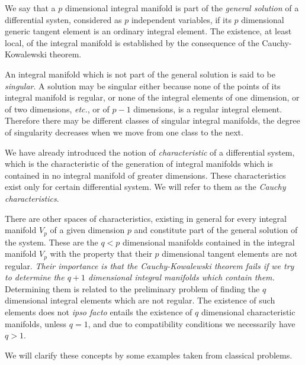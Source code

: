 \fsec We say that a $p$ dimensional integral manifold is part of the \emph{general solution} of a differential systen, considered as $p$ independent variables, if its $p$ dimensional generic tangent element is an ordinary integral element. The existence, at least local, of the integral manifold is established by the consequence of the Cauchy-Kowalewski theorem.

An integral manifold which is not part of the general solution is said to be \emph{singular}. A solution may be singular either because none of the points of its integral manifold is regular, or none of the integral elements of one dimension, or of two dimensions, \emph{etc.}, or of $p-1$ dimensions, is a regular integral element. Therefore there may be different classes of singular integral manifolds, the degree of singularity decreases when we move from one class to the next.



\vspace{12pt}\fsec We have already introduced the notion of \emph{characteristic} of a differential system, which is the characteristic of the generation of integral manifolds which is contained in no integral manifold of greater dimensions. These characteristics exist only for certain differential system. We will refer to them as the \emph{Cauchy characteristics}.

There are other spaces of characteristics, existing in general for every integral manifold $V_{p}$ of a given dimension $p$ and constitute part of the general solution of the system. These are the $q<p$ dimensional manifolds contained in the integral manifold $V_{p}$ with the property that their $p$ dimensional tangent elements are not regular.  \emph{Their importance is that the Cauchy-Kowalewski theorem fails if we try to determine the $q+1$ dimensional integral manifolds which contain them.} Determining them is related to the preliminary problem of finding the $q$ dimensional integral elements which are not regular. The existence of such elements does not \emph{ipso facto} entails the existence of $q$ dimensional characteristic manifolds, unless $q=1$, and due to compatibility conditions we necessarily have $q>1$.

We will clarify these concepts by some examples taken from classical problems.



